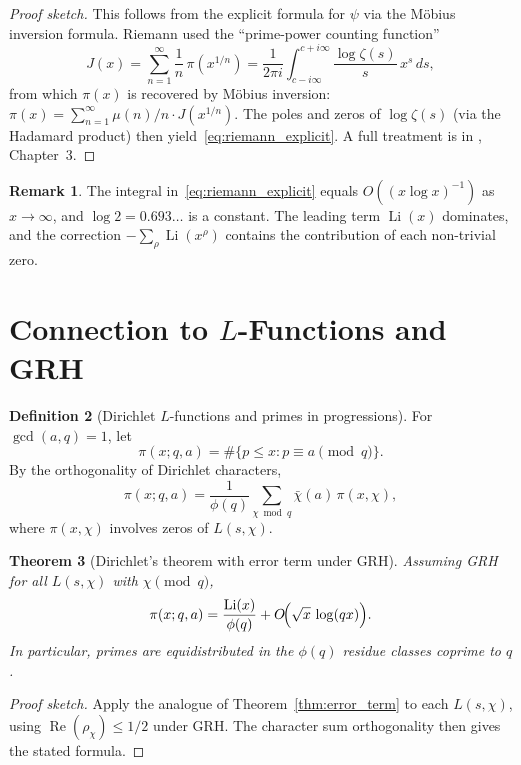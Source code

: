 \documentclass[12pt,a4paper]{amsart}
\newtheorem{theorem}{Theorem}[section]
\theoremstyle{definition}
\newtheorem{definition}[theorem]{Definition}
\newtheorem{remark}[theorem]{Remark}
\DeclareMathOperator{\Re}{Re}
\DeclareMathOperator{\Li}{Li}
\begin{document}
\begin{proof}[Proof sketch]
This follows from the explicit formula for $\psi$ via the M\"obius
inversion formula.  Riemann used the ``prime-power counting function''
\[
  J(x) = \sum_{n=1}^{\infty} \frac{1}{n}\,\pi(x^{1/n})
  = \frac{1}{2\pi i}\int_{c-i\infty}^{c+i\infty} \frac{\log\zeta(s)}{s}\,x^s\,ds,
\]
from which $\pi(x)$ is recovered by M\"obius inversion:
$\pi(x) = \sum_{n=1}^\infty \mu(n)/n \cdot J(x^{1/n})$.
The poles and zeros of $\log\zeta(s)$ (via the Hadamard product)
then yield~\eqref{eq:riemann_explicit}.
A full treatment is in \cite{Titchmarsh1986}, Chapter~3.
\end{proof}

\begin{remark}
The integral in~\eqref{eq:riemann_explicit} equals $O\!\left((x\log x)^{-1}\right)$
as $x \to \infty$, and $\log 2 = 0.693\ldots$ is a constant.  The leading
term $\Li(x)$ dominates, and the correction $-\sum_\rho \Li(x^\rho)$ contains
the contribution of each non-trivial zero.
\end{remark}

\section{Connection to \texorpdfstring{$L$}{L}-Functions and GRH}

\begin{definition}[Dirichlet $L$-functions and primes in progressions]
\label{def:pnt_progressions}
For $\gcd(a, q) = 1$, let
\[
  \pi(x; q, a) = \#\{p \le x : p \equiv a \pmod q\}.
\]
By the orthogonality of Dirichlet characters,
\[
  \pi(x; q, a) = \frac{1}{\phi(q)}\sum_{\chi \bmod q} \bar\chi(a)\,
  \pi(x, \chi),
\]
where $\pi(x, \chi)$ involves zeros of $L(s, \chi)$.
\end{definition}

\begin{theorem}[Dirichlet's theorem with error term under GRH]
\label{thm:dirichlet_grh}
Assuming GRH for all $L(s, \chi)$ with $\chi \pmod q$,
\[
  \pi(x; q, a) = \frac{\Li(x)}{\phi(q)}
  + O\!\Bigl(\sqrt{x}\,\log(qx)\Bigr).
\]
In particular, primes are equidistributed in the $\phi(q)$ residue classes
coprime to $q$.
\end{theorem}

\begin{proof}[Proof sketch]
Apply the analogue of Theorem~\ref{thm:error_term} to each $L(s, \chi)$,
using $\Re(\rho_\chi) \le 1/2$ under GRH.  The character sum orthogonality
then gives the stated formula.
\end{proof}
\end{document}
